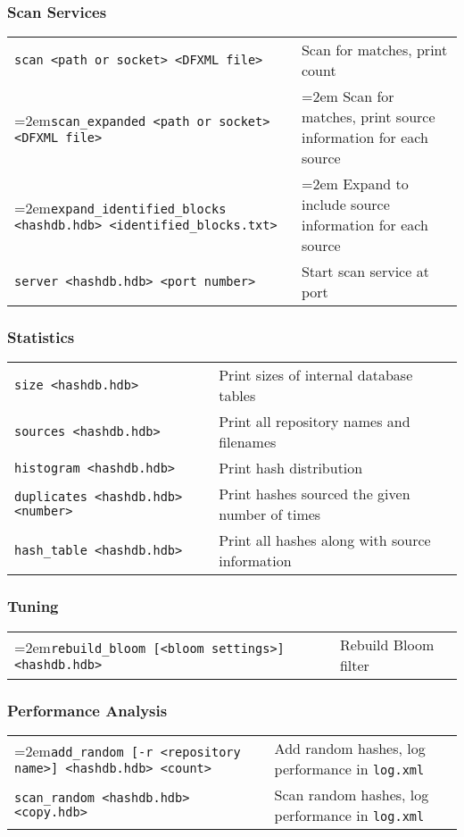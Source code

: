 \documentclass[12pt]{article}
\begin{document}
\subsubsection*{Scan Services}
\begin{tabular}{p{10 cm} p{9 cm} }
\texttt{scan <path or socket> <DFXML file>} & Scan for matches, print count\\
\hangindent=2em\texttt{scan\_expanded <path or socket> <DFXML file>} & \hangindent=2em Scan for matches, print source information for each source \\
\hangindent=2em\texttt{expand\_identified\_blocks <hashdb.hdb> <identified\_blocks.txt>} & \hangindent=2em Expand to include source information for each source \\
\texttt{server <hashdb.hdb> <port number>} & Start scan service at port \\
\end{tabular}

\subsubsection*{Statistics}
\begin{tabular}{p{10 cm} p{9 cm} }
\texttt{size <hashdb.hdb>} & Print sizes of internal database tables \\
\texttt{sources <hashdb.hdb>} & Print all repository names and filenames \\
\texttt{histogram <hashdb.hdb>} & Print hash distribution \\
\texttt{duplicates <hashdb.hdb> <number>} & Print hashes sourced the given number of times \\
\texttt{hash\_table <hashdb.hdb>} & Print all hashes along with source information\\
\end{tabular}

\subsubsection*{Tuning}
\begin{tabular}{p{10 cm} p{9 cm} }
\hangindent=2em\texttt{rebuild\_bloom [<bloom settings>] <hashdb.hdb>} & Rebuild Bloom filter \\
\end{tabular}

\subsubsection*{Performance Analysis}
\begin{tabular}{p{10 cm} p{9 cm} }
\hangindent=2em\texttt{add\_random [-r <repository name>] <hashdb.hdb> <count>} & Add random hashes, log performance in \texttt{log.xml}\\
\texttt{scan\_random <hashdb.hdb> <copy.hdb>} & Scan random hashes, log performance in \texttt{log.xml}\\
\end{tabular}
\end{document}
